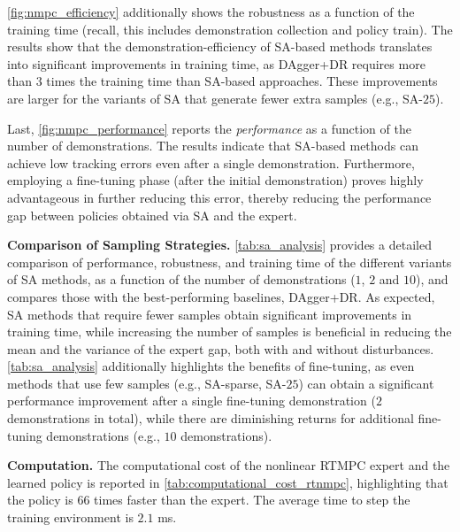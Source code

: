 \cref{fig:nmpc_efficiency} additionally shows the robustness as a function of the training time (recall, this includes demonstration collection and policy train). The results show that the demonstration-efficiency of \ac{SA}-based methods translates into significant improvements in training time, as \ac{DAgger}+\ac{DR} requires more than $3$ times the training time than \ac{SA}-based approaches. These improvements are larger for the variants of \ac{SA} that generate fewer extra samples (e.g., \ac{SA}-$25$).

Last, \cref{fig:nmpc_performance} reports the \textit{performance} as a function of the number of demonstrations. The results indicate that \ac{SA}-based methods can achieve low tracking errors even after a single demonstration. Furthermore, employing a fine-tuning phase (after the initial demonstration) proves highly advantageous in further reducing this error, thereby reducing the performance gap between policies obtained via \ac{SA} and the expert.


\noindent \textbf{Comparison of Sampling Strategies.}
\cref{tab:sa_analysis} provides a detailed comparison of performance, robustness, and training time of the different variants of \ac{SA} methods, as a function of the number of demonstrations ($1$, $2$ and $10$), and compares those with the best-performing baselines, \ac{DAgger}+\ac{DR}.  As expected, \ac{SA} methods that require fewer samples obtain significant improvements in training time, while increasing the number of samples is beneficial in reducing the mean and the variance of the expert gap, both with and without disturbances. \cref{tab:sa_analysis} additionally highlights the benefits of fine-tuning, as even methods that use few samples (e.g., SA-sparse, SA-$25$) can obtain a significant performance improvement after a single fine-tuning demonstration ($2$ demonstrations in total), while there are diminishing returns for additional fine-tuning demonstrations (e.g., $10$ demonstrations).     



\noindent
\textbf{Computation.} The computational cost of the nonlinear \ac{RTMPC} expert and the learned policy is reported in \cref{tab:computational_cost_rtnmpc}, highlighting that the policy is $66$ times faster than the expert. The average time to step the training environment is $2.1$ ms.



